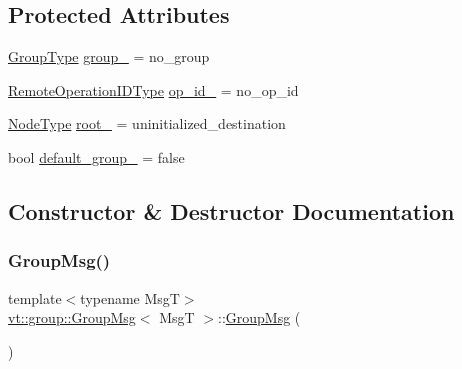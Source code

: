 \subsection*{Protected Attributes}
\begin{DoxyCompactItemize}
\item 
\hyperlink{namespacevt_a27b5e4411c9b6140c49100e050e2f743}{Group\+Type} \hyperlink{structvt_1_1group_1_1_group_msg_a490c257a68f857c6833804c065cb5d4f}{group\+\_\+} = no\+\_\+group
\item 
\hyperlink{namespacevt_1_1group_a73f2624ddeb535b39a08b6524f26b244}{Remote\+Operation\+I\+D\+Type} \hyperlink{structvt_1_1group_1_1_group_msg_a7914cacc92ff971aca0b9b2dc3cb86a3}{op\+\_\+id\+\_\+} = no\+\_\+op\+\_\+id
\item 
\hyperlink{namespacevt_a866da9d0efc19c0a1ce79e9e492f47e2}{Node\+Type} \hyperlink{structvt_1_1group_1_1_group_msg_a79b75c7a2a3e2788132bd494148e5952}{root\+\_\+} = uninitialized\+\_\+destination
\item 
bool \hyperlink{structvt_1_1group_1_1_group_msg_a42bcb186fa2675b7a16411a959dd936e}{default\+\_\+group\+\_\+} = false
\end{DoxyCompactItemize}


\subsection{Constructor \& Destructor Documentation}
\mbox{\label{structvt_1_1group_1_1_group_msg_a219a5c51a93a60b1ace49a17503fdfc0}} 
\subsubsection{\texorpdfstring{Group\+Msg()}{GroupMsg()}\hspace{0.1cm}{\footnotesize\ttfamily [1/3]}}
{\footnotesize\ttfamily template$<$typename MsgT$>$ \\
\hyperlink{structvt_1_1group_1_1_group_msg}{vt\+::group\+::\+Group\+Msg}$<$ MsgT $>$\+::\hyperlink{structvt_1_1group_1_1_group_msg}{Group\+Msg} (\begin{DoxyParamCaption}{ }\end{DoxyParamCaption})\hspace{0.3cm}{\ttfamily [default]}}

